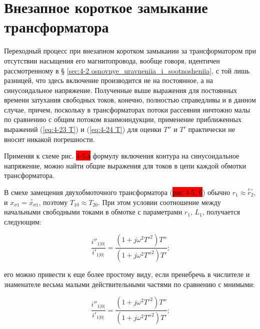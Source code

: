 \section{Внезапное короткое замыкание трансформатора}
\label{sec:4-5}

Переходный процесс при внезапном коротком замыкании за трансформатором при отсутствии насыщения его магнитопровода, вообще говоря, идентичен рассмотренному в § \ref{sec:4-2 osnovnye_uravneniia_i_sootnosheniia}, с той лишь разницей, что здесь включение производится не на постоянное, а на синусоидальное напряжение. Полученные выше выражения для постоянных времени затухания свободных токов, конечно, полностью справедливы и в данном случае, причем, поскольку в трансформаторах потоки рассеяния ничтожно малы по сравнению с общим потоком взаимоиндукции, применение приближенных выражений (\ref{eq:4-23 T}) и (\ref{eq:4-24 T}) для оценки $ T'' $ и $ T' $ практически не вносит никакой погрешности.

Применяя к схеме рис. \colorbox{red}{4-5,а} формулу включения контура на синусоидальное напряжение, можно найти общие выражения для токов в цепи каждой обмотки трансформатора.

В смехе замещения двухобмоточного трансформатора (\colorbox{red}{рис 4-5, б}) обычно $ r_1 \approx \overset{r\circ}{r_2} $, и $ x_{\sigma 1} = \overset{~\circ}{x}_{\sigma1} $, поэтому $ T_{10} \approx T_{20} $. При этом условии соотношение между начальными свободными токами в обмотке с параметрами $ r_1 $, $ L_1 $, получается следующим:

\begin{equation}
    \label{eq:4-29 ii}
    \frac{i''_{1|0|}}{i'_{1|0|}} = \frac{(1+j \omega^2 T'^2)T''}{(1+j \omega^2 T''^2)T'} \text{;}
\end{equation}

его можно привести к еще более простому виду, если пренебречь в числителе и знаменателе весьма малыми действительными частями по сравнению с мнимыми:

\begin{equation}
    \label{eq:4-30 ii}
    \frac{i''_{1|0|}}{i'_{1|0|}} = \frac{(1+j \omega^2 T'^2)T''}{(1+j \omega^2 T''^2)T'} \text{;}
\end{equation}














